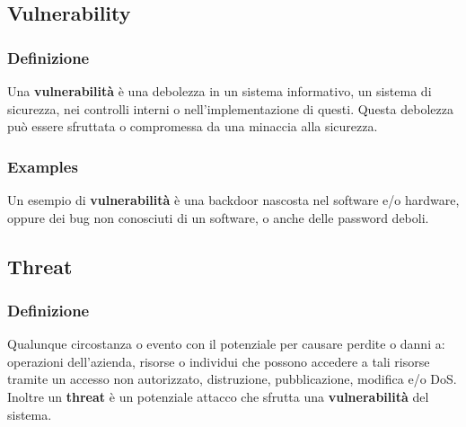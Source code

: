     \subsection{Vulnerability}
        \subsubsection{Definizione}
            Una \textbf{vulnerabilità} è una debolezza in un sistema informativo, un sistema di sicurezza, nei controlli interni o nell'implementazione di questi. Questa debolezza può essere sfruttata o compromessa da una minaccia alla sicurezza.
        \subsubsection{Examples}
            Un esempio di \textbf{vulnerabilità} è una backdoor nascosta nel software e/o hardware, oppure dei bug non conosciuti di un software, o anche delle password deboli.
    \subsection{Threat}
        \subsubsection{Definizione}
            Qualunque circostanza o evento con il potenziale per causare perdite o danni a: operazioni dell'azienda, risorse o individui che possono accedere a tali risorse tramite un accesso non autorizzato, distruzione, pubblicazione, modifica e/o DoS. Inoltre un \textbf{threat} è un potenziale attacco che sfrutta una \textbf{vulnerabilità} del sistema.
